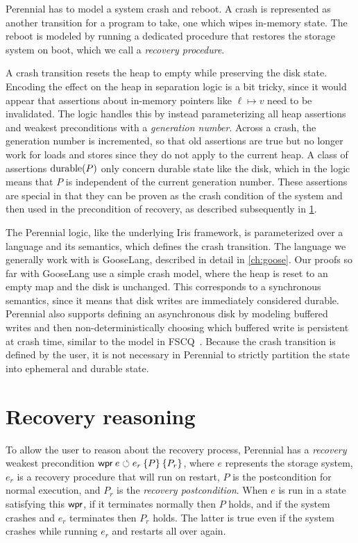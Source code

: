 Perennial has to model a system crash and reboot. A crash is represented as
another transition for a program to take, one which wipes in-memory state. The
reboot is modeled by running a dedicated procedure that restores the storage
system on boot, which we call a \emph{recovery procedure}.

A crash transition resets the heap to empty while preserving the disk state.
Encoding the effect on the heap in separation logic is a bit tricky, since it would appear that
assertions about in-memory pointers like $\ell \mapsto v$ need to be
invalidated. The logic handles this by instead parameterizing all heap
assertions and weakest preconditions with a \emph{generation number}. Across a
crash, the generation number is incremented, so that old assertions are true but
no longer work for loads and stores since they do not apply to the current heap.
A class of assertions $\operatorname{durable}(P)$ only concern durable state like the disk, which in the
logic means that $P$ is independent of the current generation number. These
assertions are special in that they can be proven as the crash condition of the
system and then used in the precondition of recovery, as described subsequently
in \cref{sec:perennial:recovery}.

The Perennial logic, like the underlying Iris framework, is parameterized over a
language and its semantics, which defines the crash transition. The
language we generally work with is GooseLang, described in detail in
\cref{ch:goose}. Our proofs so far with GooseLang use a simple crash model,
where the heap is reset to an empty map and the disk is unchanged. This
corresponds to a synchronous semantics, since it means that disk writes are
immediately considered durable. Perennial also supports defining an asynchronous
disk by modeling buffered writes and then non-deterministically choosing which
buffered write is persistent at crash time, similar to the model in
FSCQ~\cite{chen:fscq}. Because the crash transition is defined by the user, it
is not necessary in Perennial to strictly partition the state into ephemeral and
durable state.

\section{Recovery reasoning}
\label{sec:perennial:recovery}

To allow the user to reason about the recovery process, Perennial
has a \emph{recovery} weakest precondition $\wpr{e}{e_{r}}{P}{P_{r}}$,
where $e$ represents the storage system, $e_{r}$ is a recovery procedure that
will run on restart, $P$ is the postcondition for normal execution, and $P_{r}$
is the \emph{recovery postcondition}. When $e$ is run in a state satisfying this
$\textsf{\upshape wpr}$, if it terminates normally then $P$ holds, and if the system crashes and
$e_{r}$ terminates then $P_{r}$ holds. The latter is true even if the system
crashes while running $e_{r}$ and restarts all over again.

